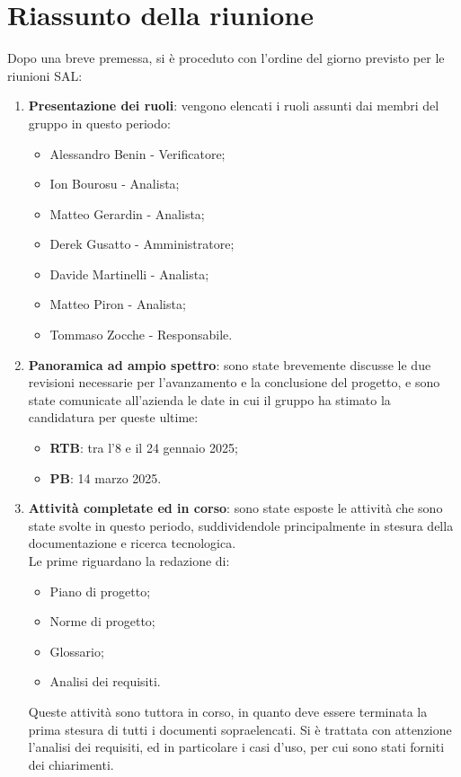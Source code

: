 \section{Riassunto della riunione}
Dopo una breve premessa, si è proceduto con l'ordine del giorno previsto per le riunioni SAL:
\begin{enumerate}
    \item \textbf{Presentazione dei ruoli}: vengono elencati i ruoli assunti dai membri del gruppo in questo periodo:
    \begin{itemize}
        \item Alessandro Benin - Verificatore;
        \item Ion Bourosu - Analista;
        \item Matteo Gerardin - Analista;
        \item Derek Gusatto - Amministratore;
        \item Davide Martinelli - Analista;
        \item Matteo Piron - Analista;
        \item Tommaso Zocche - Responsabile.
    \end{itemize}
    \item \textbf{Panoramica ad ampio spettro}: sono state brevemente discusse le due revisioni necessarie per l'avanzamento e la conclusione del progetto, e sono state comunicate all'azienda le date in cui il gruppo ha stimato la candidatura per queste ultime:
    \begin{itemize}
        \item \textbf{RTB}: tra l'8 e il 24 gennaio 2025;
        \item \textbf{PB}: 14 marzo 2025.
    \end{itemize}
    \item \textbf{Attività completate ed in corso}: sono state esposte le attività che sono state svolte in questo periodo, suddividendole principalmente in stesura della documentazione e ricerca tecnologica.\\
    Le prime riguardano la redazione di:
    \begin{itemize}
        \item Piano di progetto;
        \item Norme di progetto;
        \item Glossario;
        \item Analisi dei requisiti.
    \end{itemize}
    Queste attività sono tuttora in corso, in quanto deve essere terminata la prima stesura di tutti i documenti sopraelencati. Si è trattata con attenzione l'analisi dei requisiti, ed in particolare i casi d'uso, per cui sono stati forniti dei chiarimenti.\\

\end{enumerate}
